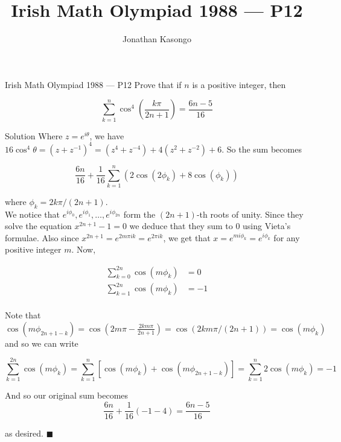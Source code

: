 \documentclass{article}
\author{Jonathan Kasongo}
\title{Irish Math Olympiad 1988 --- P12}
\begin{document}
\maketitle

\begin{problem}{Irish Math Olympiad 1988 --- P12}
Prove that if $n$ is a positive integer, then

$$
\sum_{k=1}^n \cos^4 \left( \frac{k\pi}{2n+1} \right) = \frac{6n-5}{16}
$$
\end{problem}

\begin{solution}{Solution}
Where $z = e^{i \theta}$, we have $16\cos^4 \theta = (z + z^{-1})^4 =
(z^4 + z^{-4}) + 4(z^2 + z^{-2}) + 6$. So the sum becomes

$$
\frac{6n}{16} + \frac{1}{16}\sum_{k=1}^n \left( 2\cos(2 \phi_k) + 8\cos(\phi_k) \right)
$$

where $\phi_k = 2k\pi / (2n+1)$.\\

We notice that $e^{i \phi_0}, e^{i \phi_1}, \ldots, e^{i\phi_{2n}}$ form the
$(2n+1)$-th roots of unity. Since they solve the equation $x^{2n+1} - 1 = 0$
we deduce that they sum to 0 using Vieta's formulae. Also since
$x^{2n+1} = e^{2m \pi i k} = e^{2\pi i k}$, we get that $x = e^{mi \phi_k}
= e^{i \phi_k}$ for any positive integer $m$. Now,

\[
\begin{aligned}
\sum_{k=0}^{2n} \cos(m\phi_k) &= 0 \\
\sum_{k=1}^{2n} \cos(m\phi_k) &= -1 \\
\end{aligned}
\]

Note that $\cos(m\phi_{2n+1-k}) = \cos\left(2m\pi - \frac{2km\pi}{2n+1
}\right) = \cos(2km\pi/(2n+1)) = \cos(m \phi_k)$ and so we can write

$$
\sum_{k=1}^{2n} \cos(m\phi_k) =
\sum_{k=1}^{n} \left[\cos(m\phi_k) + \cos(m\phi_{2n+1-k}) \right]=
\sum_{k=1}^n 2\cos(m \phi_k) = -1
$$

And so our original sum becomes
$$
\frac{6n}{16} + \frac{1}{16} (-1 - 4) = \frac{6n - 5}{16}
$$

as desired. $\blacksquare$
\end{solution}
\end{document}
